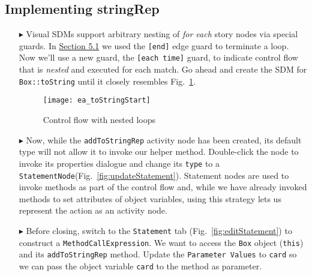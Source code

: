 \newpage
\hypertarget{stringRep vis}{}
\subsection{Implementing stringRep}
\visHeader

\begin{itemize}

\item[$\blacktriangleright$] Visual SDMs support arbitrary nesting of \emph{for each} story nodes via special guards. In \hyperlink{emptyPartition vis}{Section
5.1} we used the \texttt{[end]} edge guard to terminate a loop. Now we'll use a new guard, the \texttt{[each time]} guard, to indicate control flow that is \emph{nested} and
executed for each match. Go ahead and create the SDM for \texttt{Box::toString} until it closely resembles Fig.~\ref{fig:sdm_tostring_1}. 

\vspace{0.5cm}

\begin{figure}[htbp]
\begin{center}
  \texttt{[image: ea\_toStringStart]}
  \caption{Control flow with nested loops} 
  \label{fig:sdm_tostring_1}
\end{center}
\end{figure}

\clearpage

\item[$\blacktriangleright$] Now, while the \texttt{addToStringRep} activity node has been created, its default type will not allow it to invoke our helper
method. Double-click the node to invoke its properties dialogue and change its \texttt{type} to a \texttt{StatementNode}(Fig.~\ref{fig:updateStatement}). Statement nodes are used to invoke methods as part of the control flow and, while we have already invoked methods to set
attributes of object variables, using this strategy lets us represent the action as an activity node.

\vspace{0.5cm}

\item[$\blacktriangleright$] Before closing, switch to the \texttt{Statement} tab (Fig.~\ref{fig:editStatement}) to construct a \texttt{MethodCallExpression}.
We want to access the \texttt{Box} object (\texttt{this}) and its \texttt{addToStringRep} method. Update the \texttt{Parameter Values} to \texttt{card} so we
can pass the object variable \texttt{card} to the method as parameter.


\end{itemize}
